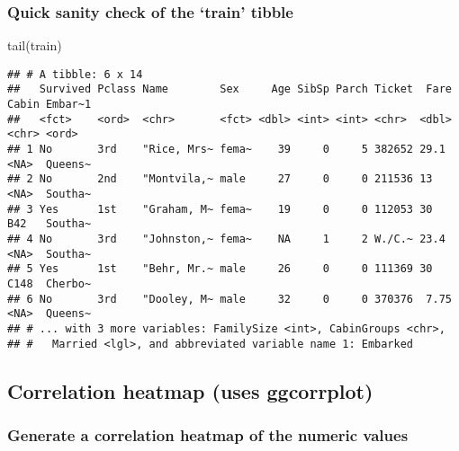 \documentclass[
]{article}
\newenvironment{Shaded}{\begin{snugshade}}{\end{snugshade}}
\newcommand{\FunctionTok}[1]{\textcolor[rgb]{0.00,0.00,0.00}{#1}}
\newcommand{\NormalTok}[1]{#1}
\begin{document}
\hypertarget{quick-sanity-check-of-the-train-tibble}{%
\subsubsection{Quick sanity check of the `train'
tibble}\label{quick-sanity-check-of-the-train-tibble}}

\begin{Shaded}
\begin{Highlighting}[]
\FunctionTok{tail}\NormalTok{(train)}
\end{Highlighting}
\end{Shaded}

\begin{verbatim}
## # A tibble: 6 x 14
##   Survived Pclass Name        Sex     Age SibSp Parch Ticket  Fare Cabin Embar~1
##   <fct>    <ord>  <chr>       <fct> <dbl> <int> <int> <chr>  <dbl> <chr> <ord>  
## 1 No       3rd    "Rice, Mrs~ fema~    39     0     5 382652 29.1  <NA>  Queens~
## 2 No       2nd    "Montvila,~ male     27     0     0 211536 13    <NA>  Southa~
## 3 Yes      1st    "Graham, M~ fema~    19     0     0 112053 30    B42   Southa~
## 4 No       3rd    "Johnston,~ fema~    NA     1     2 W./C.~ 23.4  <NA>  Southa~
## 5 Yes      1st    "Behr, Mr.~ male     26     0     0 111369 30    C148  Cherbo~
## 6 No       3rd    "Dooley, M~ male     32     0     0 370376  7.75 <NA>  Queens~
## # ... with 3 more variables: FamilySize <int>, CabinGroups <chr>,
## #   Married <lgl>, and abbreviated variable name 1: Embarked
\end{verbatim}

\hypertarget{correlation-heatmap-uses-ggcorrplot}{%
\subsection{Correlation heatmap (uses
ggcorrplot)}\label{correlation-heatmap-uses-ggcorrplot}}

\hypertarget{generate-a-correlation-heatmap-of-the-numeric-values}{%
\subsubsection{Generate a correlation heatmap of the numeric
values}\label{generate-a-correlation-heatmap-of-the-numeric-values}}
\end{document}
